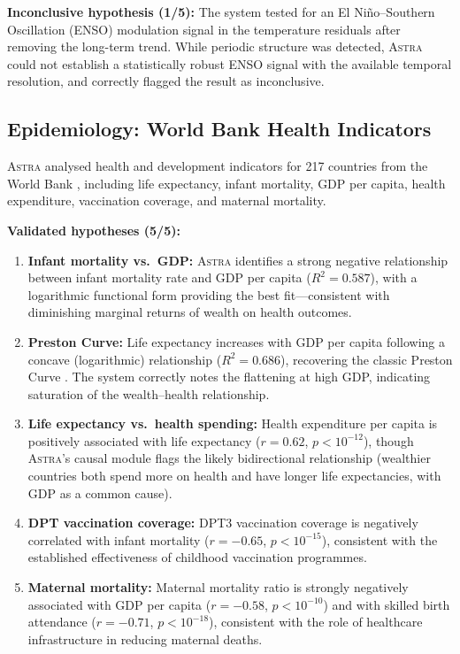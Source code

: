 \documentclass[usenatbib]{rasti}
\newcommand{\astra}{\textsc{Astra}\xspace}
\begin{document}
\textbf{Inconclusive hypothesis (1/5):}
The system tested for an El Ni\~{n}o--Southern Oscillation (ENSO) modulation signal in the temperature residuals after removing the long-term trend. While periodic structure was detected, \astra could not establish a statistically robust ENSO signal with the available temporal resolution, and correctly flagged the result as inconclusive.

\subsection{Epidemiology: World Bank Health Indicators}
\label{sec:crossdomain:epidemiology}

\astra analysed health and development indicators for 217 countries from the World Bank \citep{WorldBank2024}, including life expectancy, infant mortality, GDP per capita, health expenditure, vaccination coverage, and maternal mortality.

\textbf{Validated hypotheses (5/5):}
\begin{enumerate}
  \item[(i)] \textbf{Infant mortality vs.\ GDP:} \astra identifies a strong negative relationship between infant mortality rate and GDP per capita ($R^{2} = 0.587$), with a logarithmic functional form providing the best fit---consistent with diminishing marginal returns of wealth on health outcomes.
  \item[(ii)] \textbf{Preston Curve:} Life expectancy increases with GDP per capita following a concave (logarithmic) relationship ($R^{2} = 0.686$), recovering the classic Preston Curve \citep{Preston1975}. The system correctly notes the flattening at high GDP, indicating saturation of the wealth--health relationship.
  \item[(iii)] \textbf{Life expectancy vs.\ health spending:} Health expenditure per capita is positively associated with life expectancy ($r = 0.62$, $p < 10^{-12}$), though \astra's causal module flags the likely bidirectional relationship (wealthier countries both spend more on health and have longer life expectancies, with GDP as a common cause).
  \item[(iv)] \textbf{DPT vaccination coverage:} DPT3 vaccination coverage is negatively correlated with infant mortality ($r = -0.65$, $p < 10^{-15}$), consistent with the established effectiveness of childhood vaccination programmes.
  \item[(v)] \textbf{Maternal mortality:} Maternal mortality ratio is strongly negatively associated with GDP per capita ($r = -0.58$, $p < 10^{-10}$) and with skilled birth attendance ($r = -0.71$, $p < 10^{-18}$), consistent with the role of healthcare infrastructure in reducing maternal deaths.
\end{enumerate}
\end{document}
